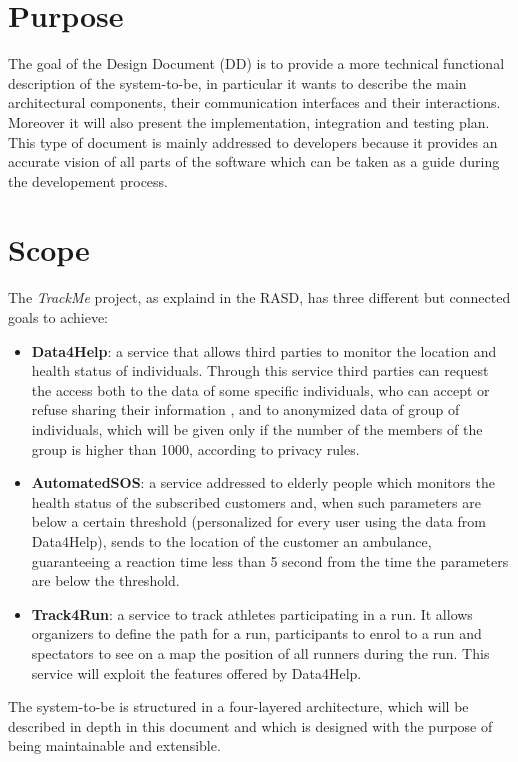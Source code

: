 \section{Purpose}
The goal of the Design Document (DD) is to provide a more technical functional description of the system-to-be, in particular it wants to describe the main architectural components, their communication interfaces and their interactions. Moreover it will also present the implementation, integration and testing plan.
This type of document is mainly addressed to developers because it provides an accurate vision of all parts of the software which can be taken as a guide during the developement process.
\section{Scope}
The \textit{TrackMe} project, as explaind in the RASD, has three different but connected goals to achieve:
\begin{itemize}
  \item \textbf{Data4Help}: a service that allows third parties to monitor the location and health status of individuals. Through this service third parties can request the access both to the data of some specific individuals, who can accept or refuse sharing their information , and to anonymized data of group of individuals, which will be given only if the number of the members of the group is higher than 1000, according to privacy rules.
  \item \textbf{AutomatedSOS}: a service addressed to elderly people which monitors the health status of the subscribed customers and, when such parameters are below a certain threshold (personalized for every user using the data from Data4Help), sends to the location of the customer an ambulance, guaranteeing a reaction time less than 5 second from the time the parameters are below the threshold.
  \item \textbf{Track4Run}: a service to track athletes participating in a run. It allows organizers to define the path for a run, participants to enrol to a run and spectators to see on a map the position of all runners during the run. This service will exploit the features offered by Data4Help.
\end{itemize}
The system-to-be is structured in a four-layered architecture, which will be described in depth in this document and which is designed with the purpose of being maintainable and extensible.
